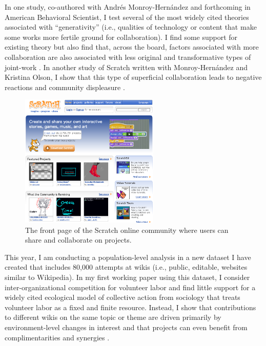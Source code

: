 \documentclass[10pt]{memoir}
\begin{document}
In one study, co-authored with Andrés Monroy-Hernández and forthcoming
in American Behavioral Scientist, I test several of the most widely
cited theories associated with ``generativity'' (i.e., qualities of
technology or content that make some works more fertile ground for
collaboration). I find some support for existing theory but also find
that, across the board, factors associated with more collaboration are
also associated with less original and transformative types of
joint-work \cite{hill_remixing_2012}. In another study of Scratch
written with Monroy-Hernández and Kristina Olson, I show that this type
of superficial collaboration leads to negative reactions and community
displeasure \cite{hill_responses_2010}.

\begin{figure}
 \begin{centering}
 \includegraphics[width=2.6in]{figures/frontpage_modified-topremix.png}
  \caption{The front page of the Scratch online community where users
    can share and collaborate on projects.}
 \label{fig:scratchfrontpage}
 \end{centering}
 \vspace{-2em}
\end{figure}

This year, I am conducting a population-level analysis in a new
dataset I have created that includes 80,000 attempts at wikis (i.e.,
public, editable, websites similar to Wikipedia). In my first working
paper using this dataset, I consider inter-organizational competition
for volunteer labor and find little support for a widely cited
ecological model of collective action from sociology that treats
volunteer labor as a fixed and finite resource. Instead, I show that
contributions to different wikis on the same topic or theme are driven
primarily by environment-level changes in interest and that projects
can even benefit from complimentarities and synergies
\cite{hill_is_2012}.
\end{document}
